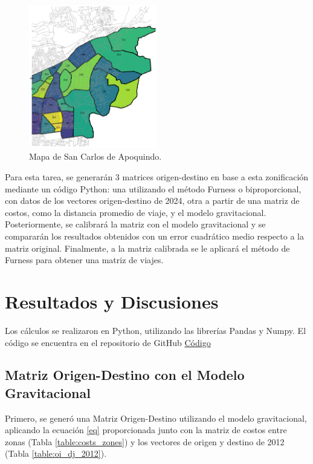 \documentclass[letterpaper,12pt]{article}
\begin{document}
\begin{figure}[h!]
    \centering
    \includegraphics[width=0.5\textwidth]{fotos/mapa.png}
    \caption{Mapa de San Carlos de Apoquindo.}
    \label{fig:mapa}
\end{figure}

Para esta tarea, se generarán 3 matrices origen-destino en base a esta zonificación mediante un código Python: una utilizando el método Furness o biproporcional, con datos de los vectores origen-destino de 2024, otra a partir de una matriz de costos, como la distancia promedio de viaje, y el modelo gravitacional. Posteriormente, se calibrará la matriz con el modelo gravitacional y se compararán los resultados obtenidos con un error cuadrático medio respecto a la matriz original. Finalmente, a la matriz calibrada se le aplicará el método de Furness para obtener una matriz de viajes.



\section{Resultados y Discusiones}
Los cálculos se realizaron en Python, utilizando las librerías Pandas y Numpy. El código se encuentra en el repositorio de GitHub \href{https://github.com/berckanala/T3_autitos/blob/main/t3.py}{Código}
\subsection{Matriz Origen-Destino con el Modelo Gravitacional}
Primero, se generó una Matriz Origen-Destino utilizando el modelo gravitacional, aplicando la ecuación \ref{eq} proporcionada junto con la matriz de costos entre zonas (Tabla \ref{table:costs_zones}) y los vectores de origen y destino de 2012 (Tabla \ref{table:oi_dj_2012}).
\end{document}
